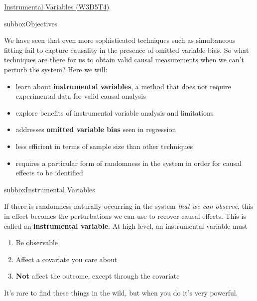 \begin{textbox}{\href{https://compneuro.neuromatch.io/tutorials/W3D5_NetworkCausality/student/W3D5_Tutorial4.html}{Instrumental Variables (W3D5T4)}   }

\begin{subbox}{subbox}{Objectives}
\scriptsize


We have seen that even more sophisticated techniques such as simultaneous fitting fail to capture causality in the presence of omitted variable bias. So what techniques are there for us to obtain valid causal measurements when we can't perturb the system? Here we will:
\begin{itemize}
    \item 
 learn about \textbf{instrumental variables}, a method that does not require experimental data for valid causal analysis
\item  explore benefits of instrumental variable analysis and limitations
 \item  addresses \textbf{omitted variable bias} seen in regression
   \item  less efficient in terms of sample size than other techniques
 \item  requires a particular form of randomness in the system in order for causal effects to be identified
    \end{itemize}

\end{subbox}

\begin{subbox}{subbox}{Instrumental Variables}
\scriptsize

If there is randomness naturally occurring in the system \textit{that we can observe}, this in effect becomes the perturbations we can use to recover causal effects. This is called an \textbf{instrumental variable}. At high level, an instrumental variable must
\begin{enumerate}
    
\item Be observable
\item  Affect a covariate you care about
\item  \textbf{Not} affect the outcome, except through the covariate
\end{enumerate}

It's rare to find these things in the wild, but when you do it's very powerful.
\begin{center}
    

\end{center}
\end{subbox}
\end{textbox}
